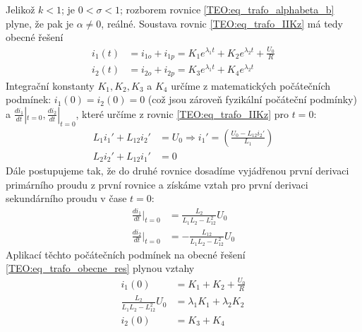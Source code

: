 \begin{example}
\begin{subequations}
  \end{subequations}
  Jelikož $k<1$; je $0<\sigma<1$; rozborem rovnice \ref{TEO:eq_trafo_alphabeta_b} plyne, že pak
  je $\alpha\neq0$, reálné. Soustava rovnic \ref{TEO:eq_trafo_IIKz} má tedy obecné řešení
  \begin{subequations}\label{TEO:eq_trafo_obecne_res}
    \begin{align}
      i_1(t) &= i_{1o} +i_{1p} = K_1e^{\lambda_1t} + K_2e^{\lambda_2t} +\frac{U_0}{R} \\
      i_2(t) &= i_{2o} +i_{2p} = K_3e^{\lambda_1t} + K_4e^{\lambda_2t}
    \end{align}
  \end{subequations}
  Integrační konstanty $K_1, K_2, K_3$ a $K_4$ určíme z matematických počátečních podmínek:
  $i_1(0)=i_2(0)=0$ (což jsou zároveň fyzikální počáteční podmínky) a $\frac{di_1}{dt}|_{t=0}, 
  \frac{di_2}{dt}|_{t=0}$, které určíme z rovnic \ref{TEO:eq_trafo_IIKz} pro $t=0$:
  \begin{subequations}\label{TEO:eq_trafo_didt_t0}
    \begin{align}
      L_1i_1'+L_{12}i_2' &= U_0 \Longrightarrow i_1' = \left(\frac{U_0-L_{12}i_2'}{L_1}\right)\\
      L_2i_2'+L_{12}i_1' &= 0
    \end{align}
  \end{subequations}
  Dále postupujeme tak, že do druhé rovnice dosadíme vyjádřenou první derivaci primárního
  proudu z první rovnice a získáme vztah pro první derivaci sekundárního proudu v čase $t=0$:
    \begin{subequations}\label{TEO:eq_trafo_dev_i1i2}
    \begin{align}
      \frac{di_1}{dt}|_{t=0} &=   \frac{L_{2}}{L_1L_2-L_{12}^2}U_0                        \\
      \frac{di_2}{dt}|_{t=0} &=  -\frac{L_{12}}{L_1L_2-L_{12}^2}U_0
    \end{align}
  \end{subequations}
  Aplikací těchto počátečních podmínek na obecné řešení \ref{TEO:eq_trafo_obecne_res} plynou
  vztahy
  \begin{subequations}
    \begin{align}
    i_1(0)                            &= K_1 + K_2 +\frac{U_0}{R}                         \\
    \frac{L_{2}}{L_1L_2-L_{12}^2}U_0  &= \lambda_1K_1 + \lambda_2K_2                      \\
    i_2(0)                            &= K_3 + K_4                                        \\

\end{align}
\end{subequations}
\end{example}
